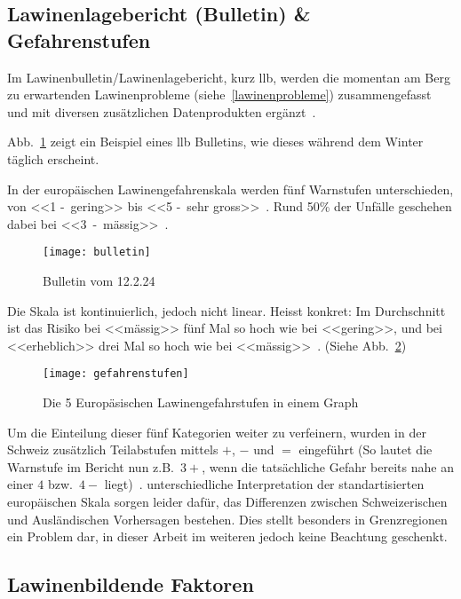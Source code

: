 \subsection{Lawinenlagebericht (Bulletin) \& Gefahrenstufen}

Im Lawinenbulletin/Lawinenlagebericht, kurz \gls{llb}, werden die momentan am Berg zu erwartenden Lawinenprobleme (siehe~\ref{lawinenprobleme}) zusammengefasst und mit diversen zusätzlichen Datenprodukten ergänzt~\cite{lawinengefskala}.

Abb.\ \ref{fig:bulletin} zeigt ein Beispiel eines \gls{llb} Bulletins, wie dieses während dem Winter täglich erscheint.

In der europäischen Lawinengefahrenskala werden fünf Warnstufen unterschieden, von <<1 -~gering>> bis <<5 -~sehr gross>>~\cite{harveyrhynerschweizerlawinenkunde}\cite{lawinengefskala}.
Rund 50\% der Unfälle geschehen dabei bei <<3~-~mässig>>~\cite{achtunglawine}.

\begin{figure}[H]
  \centering
  \texttt{[image: bulletin]}
  \caption{Bulletin vom 12.2.24~\cite{slfarchiv}}\label{fig:bulletin}
\end{figure}

Die Skala ist kontinuierlich, jedoch nicht linear. Heisst konkret: 
Im Durchschnitt ist das Risiko bei <<mässig>> fünf Mal so hoch wie bei <<gering>>, und bei <<erheblich>> drei Mal so hoch wie bei <<mässig>>~\cite{sacbergspwinter}. (Siehe Abb.\ \ref{fig:llbdanger})

\begin{figure}[H]
  \centering
  \texttt{[image: gefahrenstufen]}
  \caption{Die 5 Europäsischen Lawinengefahrstufen in einem Graph}\label{fig:llbdanger}
\end{figure}
\clearpage
Um die Einteilung dieser fünf Kategorien weiter zu verfeinern, wurden in der Schweiz zusätzlich Teilabstufen mittels $+$, $-$ und $=$ eingeführt (So lautet die Warnstufe im Bericht nun z.B.\ $3+$, wenn die tatsächliche Gefahr bereits nahe an einer $4$ bzw.\ $4-$ liegt)~\cite{sacbergspwinter}.
unterschiedliche Interpretation der standartisierten europäischen Skala sorgen leider dafür, das Differenzen zwischen Schweizerischen und Ausländischen Vorhersagen bestehen. Dies stellt besonders in Grenzregionen ein Problem dar, in dieser Arbeit im weiteren jedoch keine Beachtung geschenkt.


\subsection{Lawinenbildende Faktoren}

